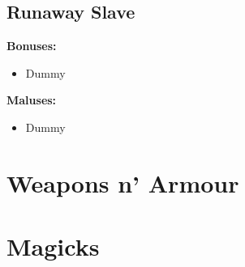 \documentclass[openany,10pt,a4paper]{book}
\begin{document}
\section{Runaway Slave}
\textbf{Bonuses:}
\begin{itemize}
	\item Dummy
\end{itemize}
\textbf{Maluses:}
\begin{itemize}
	\item Dummy
\end{itemize}
\chapter{Weapons n' Armour}
\chapter{Magicks}
\end{document}
